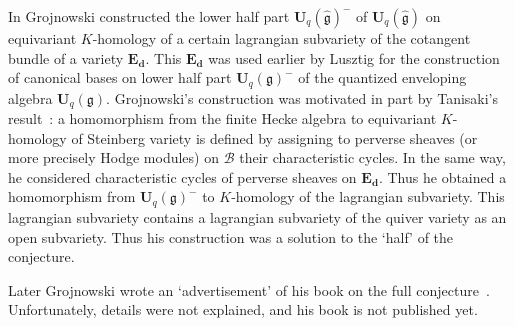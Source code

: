 \documentclass[12pt]{amsart}
\theoremstyle{definition}
\theoremstyle{remark}
\numberwithin{equation}{subsection}
\newcommand{\Uq}{{\mathbf U}_q(\mathfrak g)} %
\newcommand{\Ua}{{\mathbf U}_q(\widehat{\mathfrak g})} %
\begin{document}
In \cite{Gr_aff} Grojnowski constructed the lower half part $\Ua^-$ of
$\Ua$ on equivariant $K$-homology of a certain lagrangian
subvariety of the cotangent bundle of a variety ${\mathbf E_{\mathbf
d}}$.
%
This ${\mathbf E_{\mathbf d}}$ was used earlier by Lusztig for the
construction of canonical bases on lower half part $\Uq^-$ of the
quantized enveloping algebra $\Uq$.
%
Grojnowski's construction was motivated in part by Tanisaki's
result~\cite{Tani}: a homomorphism from the finite Hecke algebra to
equivariant $K$-homology of Steinberg variety is defined by assigning
to perverse sheaves (or more precisely Hodge modules) on $\mathcal B$
their characteristic cycles.
%
In the same way, he considered characteristic cycles of perverse
sheaves on ${\mathbf E_{\mathbf d}}$. Thus he obtained a homomorphism
from $\Uq^-$ to $K$-homology of the lagrangian subvariety.
%
This lagrangian subvariety contains a lagrangian subvariety of the
quiver variety as an open subvariety.
%
Thus his construction was a solution to the `half' of the conjecture.

Later Grojnowski wrote an `advertisement' of his book on the full
conjecture~\cite{Gr}. Unfortunately, details were not explained, and
his book is not published yet.
\end{document}
